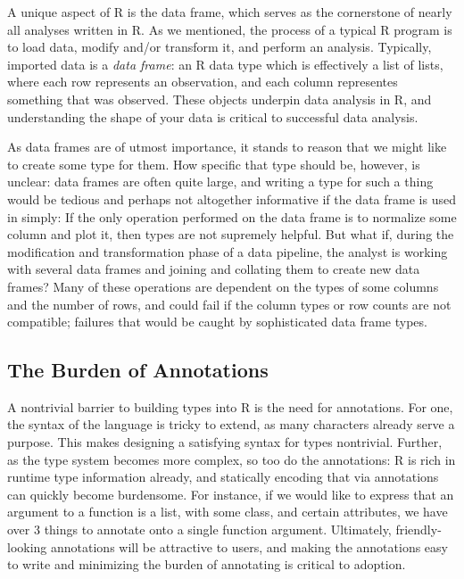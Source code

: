 \documentclass[sigplan,10pt,review]{acmart}\settopmatter{printfolios=true,printccs=false,printacmref=false}
\begin{document}
A unique aspect of R is the data frame, which serves as the cornerstone of nearly all analyses written in R.
As we mentioned, the process of a typical R program is to load data, modify and/or transform it, and perform an analysis.
Typically, imported data is a {\it data frame}: an R data type which is effectively a list of lists, where each row represents an observation, and each column representes something that was observed. 
These objects underpin data analysis in R, and understanding the shape of your data is critical to successful data analysis.

As data frames are of utmost importance, it stands to reason that we might like to create some type for them.
How specific that type should be, however, is unclear: data frames are often quite large, and writing a type for such a thing would be tedious and perhaps not altogether informative if the data frame is used in simply:
If the only operation performed on the data frame is to normalize some column and plot it, then types are not supremely helpful.
But what if, during the modification and transformation phase of a data pipeline, the analyst is working with several data frames and joining and collating them to create new data frames?
Many of these operations are dependent on the types of some columns and the number of rows, and could fail if the column types or row counts are not compatible; failures that would be caught by sophisticated data frame types.

%
%
\subsection{The Burden of Annotations}

A nontrivial barrier to building types into R is the need for annotations.
For one, the syntax of the language is tricky to extend, as many characters already serve a purpose.
This makes designing a satisfying syntax for types nontrivial.
Further, as the type system becomes more complex, so too do the annotations:
R is rich in runtime type information already, and statically encoding that via annotations can quickly become burdensome.
For instance, if we would like to express that an argument to a function is a list, with some class, and certain attributes, we have over 3 things to annotate onto a single function argument.
Ultimately, friendly-looking annotations will be attractive to users, and making the annotations easy to write and minimizing the burden of annotating is critical to adoption.
\end{document}
